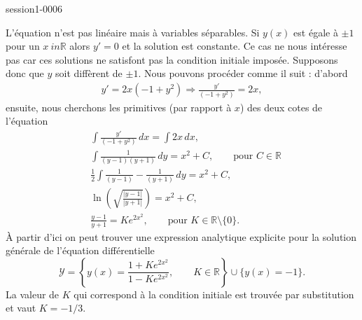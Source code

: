 
\begin{corrige}{session1-0006}

L'équation n'est pas linéaire mais \`a variables séparables. Si $y(x)$ est égale \`a $\pm 1$ pour un $x\ in \mathbb{R}$ alors $y' = 0$ et la solution est constante. Ce cas ne nous intéresse pas car ces solutions ne satisfont pas la condition initiale imposée. Supposons donc  que $y$ soit diffèrent de $\pm 1$. Nous pouvons  procéder comme il suit : d'abord  
\begin{align*}
  y'=2x(-1+y^2) \Rightarrow \frac{y'}{(-1+y^2)}  = 2x,
\end{align*}
ensuite, nous cherchons les primitives (par rapport \`a $x$) des deux cotes de l'équation
\begin{align*}
  &\int \frac{y'}{(-1+y^2)}\, dx = \int 2x \, dx , \\
  &\int \frac{1}{(y-1)(y+1)}\, dy = x^2 +C,  \qquad \text{pour } C\in\mathbb{R} \\
  &\frac{1}{2}\int \frac{1}{(y-1)}-\frac{1}{(y+1)}\, dy = x^2 +C, \\
 &\ln\left(\sqrt{\frac{|y-1|}{|y+1|}}\right) = x^2 +C ,\\
&\frac{y-1}{y+1} = Ke^{2x^2}, \qquad \text{pour } K \in\mathbb{R}\setminus\{0\} . 
\end{align*}
\`A partir d'ici on peut trouver une expression analytique explicite pour la solution générale de l'équation différentielle   
\begin{equation*}
 \mathcal{Y} = \left\{ y(x) = \frac{1+Ke^{2x^2}}{1-Ke^{2x^2}}, \qquad  K\in\mathbb{R}\right\}\cup\{y(x)=-1\}.
\end{equation*}
La valeur de $K$ qui correspond \`a la condition initiale est trouvée par substitution et vaut $K= -1/3$.


\end{corrige}
